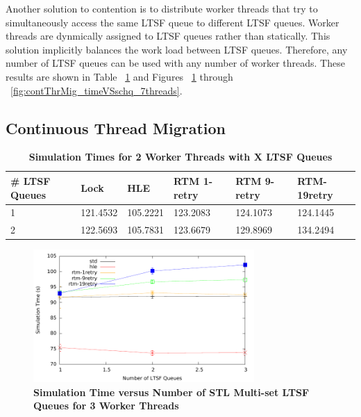 \documentclass[11pt]{book}
\begin{document}
Another solution to contention is to distribute worker threads that try to
simultaneously access the same LTSF queue to different LTSF queues.  Worker
threads are dynmically assigned to LTSF queues rather than statically.  This
solution implicitly balances the work load between LTSF queues.  Therefore, any
number of LTSF queues can be used with any number of worker threads.  These
results are shown in Table ~\ref{tab:contThrMig_2threadsXschq} and Figures
~\ref{fig:contThrMig_timeVSschq_3threads} through
~\ref{fig:contThrMig_timeVSschq_7threads}. 

\subsection{Continuous Thread Migration}

\begin{table}[H]
    \centering
    \begin{tabular}{l|p{2cm}|p{2cm}|p{2cm}|p{2cm}|p{2cm}}
        \textbf{\# LTSF Queues}&Lock &HLE &RTM 1-retry &RTM 9-retry &RTM-19retry \\
        \hline
        \midrule
            1 &121.4532  &105.2221 &123.2083  &124.1073 &124.1445 \\ 
            2 &122.5693  &105.7831 &123.6679  &129.8969 &134.2494 \\
    \end{tabular}
    \caption{\textbf{Simulation Times for 2 Worker Threads with X LTSF Queues}}
    \label{tab:contThrMig_2threadsXschq}
\end{table}

\begin{figure}[H]
    \centering
    \graphicspath{ {./figures/} }
    \includegraphics[width=0.75\textwidth,keepaspectratio]{contThrMig-hugeEpidemicSim-timeVSschedQs-multiset-3thread}
    \caption{\textbf{Simulation Time versus Number of STL Multi-set LTSF Queues
    for 3 Worker Threads}}
    \label{fig:contThrMig_timeVSschq_3threads}
\end{figure}
\end{document}
